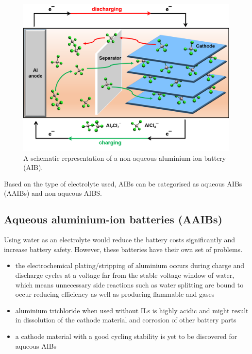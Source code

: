 \begin{figure}[tbh!]
\centering
\includegraphics[width=\textwidth]{Figures/chap1fig/AIBmech}
\caption{A schematic representation of a non-aqueous aluminium-ion battery (AIB).}
\label{Figures/chap1fig:AIBmech}
\end{figure}

Based on the type of electrolyte used, AIBs can be categorised as aqueous AIBs (AAIBs) and non-aqueous AIBS.  

\subsection{Aqueous aluminium-ion batteries (AAIBs)}
Using water as an electrolyte would reduce the battery costs significantly and increase battery safety. However, these batteries have their own set of problems. 

\begin{itemize}
    \item the electrochemical plating/stripping of aluminium occurs during charge and discharge cycles at a voltage far from the stable voltage window of water, which means unnecessary side reactions such as water splitting are bound to occur reducing efficiency as well as producing flammable  and  gases
    \item aluminium trichloride  when used without ILs is highly acidic and might result in dissolution of the cathode material and corrosion of other battery parts
    \item a cathode material with a good cycling stability is yet to be discovered for aqueous AIBs
\end{itemize}  

